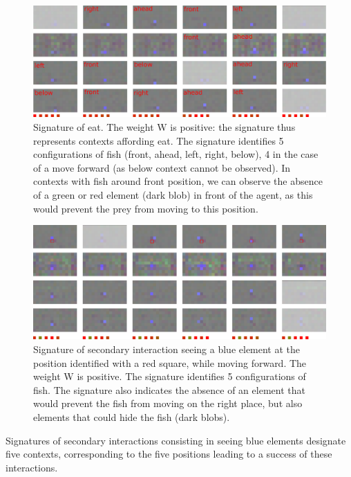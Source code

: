 \documentclass[conference]{IEEEtran}
\begin{document}
\begin{figure}[htbp]
\centerline{\includegraphics[scale=0.35]{img/sig_eat.pdf}}
\caption{Signature of eat. The weight W is positive: the signature thus represents contexts affording eat. The signature identifies 5 configurations of fish (front, ahead, left, right, below), 4 in the case of a move forward (as below context cannot be observed). In contexts with fish around front position, we can observe the absence of a green or red element (dark blob) in front of the agent, as this would prevent the prey from moving to this position.}
\label{fig}
\end{figure}

\begin{figure}[htbp]
\centerline{\includegraphics[scale=0.35]{img/sig_blue.pdf}}
\caption{Signature of secondary interaction seeing a blue element at the position identified with a red square, while moving forward. The weight W is positive. The signature identifies 5 configurations of fish. The signature also indicates the absence of an element that would prevent the fish from moving on the right place, but also elements that could hide the fish (dark blobs).}
\label{fig:sigblue}
\end{figure}

Signatures of secondary interactions consisting in seeing blue elements designate five contexts, corresponding to the five positions leading to a success of these interactions.

\end{document}
